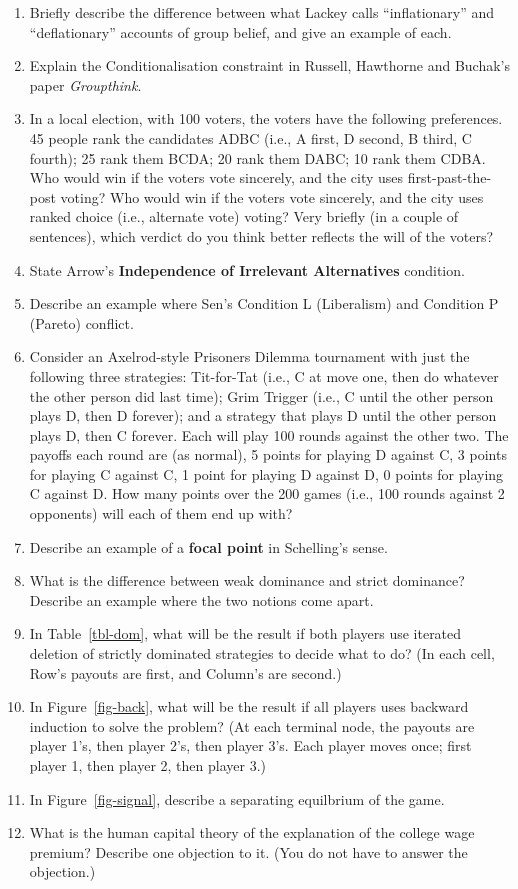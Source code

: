 \documentclass[
  12pt,
  letterpaper,
  DIV=11,
  numbers=noendperiod]{scrartcl}
\providecommand{\tightlist}{%
  \setlength{\itemsep}{0pt}\setlength{\parskip}{0pt}}\usepackage{longtable,booktabs,array}
\begin{document}
\begin{enumerate}
\def\labelenumi{\arabic{enumi}.}
\tightlist
\item
  Briefly describe the difference between what Lackey calls
  ``inflationary'' and ``deflationary'' accounts of group belief, and
  give an example of each.
\item
  Explain the Conditionalisation constraint in Russell, Hawthorne and
  Buchak's paper \emph{Groupthink}.
\item
  In a local election, with 100 voters, the voters have the following
  preferences. 45 people rank the candidates ADBC (i.e., A first, D
  second, B third, C fourth); 25 rank them BCDA; 20 rank them DABC; 10
  rank them CDBA. Who would win if the voters vote sincerely, and the
  city uses first-past-the-post voting? Who would win if the voters vote
  sincerely, and the city uses ranked choice (i.e., alternate vote)
  voting? Very briefly (in a couple of sentences), which verdict do you
  think better reflects the will of the voters?
\item
  State Arrow's \textbf{Independence of Irrelevant Alternatives}
  condition.
\item
  Describe an example where Sen's Condition L (Liberalism) and Condition
  P (Pareto) conflict.
\item
  Consider an Axelrod-style Prisoners Dilemma tournament with just the
  following three strategies: Tit-for-Tat (i.e., C at move one, then do
  whatever the other person did last time); Grim Trigger (i.e., C until
  the other person plays D, then D forever); and a strategy that plays D
  until the other person plays D, then C forever. Each will play 100
  rounds against the other two. The payoffs each round are (as normal),
  5 points for playing D against C, 3 points for playing C against C, 1
  point for playing D against D, 0 points for playing C against D. How
  many points over the 200 games (i.e., 100 rounds against 2 opponents)
  will each of them end up with?
\item
  Describe an example of a \textbf{focal point} in Schelling's sense.
\item
  What is the difference between weak dominance and strict dominance?
  Describe an example where the two notions come apart.
\item
  In Table~\ref{tbl-dom}, what will be the result if both players use
  iterated deletion of strictly dominated strategies to decide what to
  do? (In each cell, Row's payouts are first, and Column's are second.)
\item
  In Figure~\ref{fig-back}, what will be the result if all players uses
  backward induction to solve the problem? (At each terminal node, the
  payouts are player 1's, then player 2's, then player 3's. Each player
  moves once; first player 1, then player 2, then player 3.)
\item
  In Figure~\ref{fig-signal}, describe a separating equilbrium of the
  game.
\item
  What is the human capital theory of the explanation of the college
  wage premium? Describe one objection to it. (You do not have to answer
  the objection.)
\end{enumerate}
\end{document}
